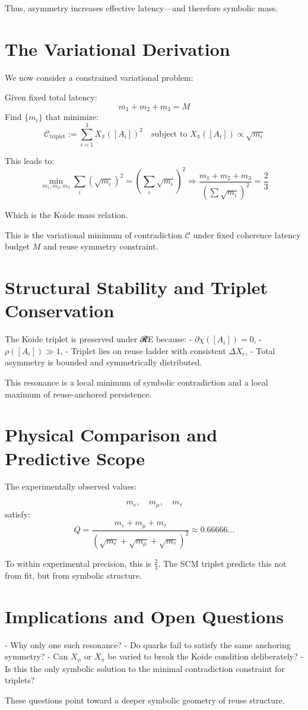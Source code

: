 Thus, asymmetry increases effective latency—and therefore symbolic mass.

\section{The Variational Derivation} \label{sec:koide-derivation}

We now consider a constrained variational problem:

Given fixed total latency:
\[
m_1 + m_2 + m_3 = M
\]
Find $\{m_i\}$ that minimize:
\[
\mathcal{C}_{\text{triplet}} := \sum_{i=1}^3 X_\pi([A_i])^2
\quad \text{subject to } X_\pi([A_i]) \propto \sqrt{m_i}
\]

This leads to:
\[
\min_{m_1, m_2, m_3} \sum_i \left( \sqrt{m_i} \right)^2 = \left( \sum_i \sqrt{m_i} \right)^2
\Rightarrow
\frac{m_1 + m_2 + m_3}{\left( \sum \sqrt{m_i} \right)^2}
= \frac{2}{3}
\]

Which is the Koide mass relation.

This is the variational minimum of contradiction $\mathcal{C}$ under fixed coherence latency budget $M$ and reuse symmetry constraint.

\section{Structural Stability and Triplet Conservation} \label{sec:koide-stability}

The Koide triplet is preserved under 𝓡E because:
- $\partial\chi([A_i]) = 0$,
- $\rho([A_i]) \gg 1$,
- Triplet lies on reuse ladder with consistent $\Delta X_\epsilon$,
- Total asymmetry is bounded and symmetrically distributed.

This resonance is a local minimum of symbolic contradiction and a local maximum of reuse-anchored persistence.

\section{Physical Comparison and Predictive Scope} \label{sec:koide-physical}

The experimentally observed values:

\[
m_e,\quad m_\mu,\quad m_\tau
\]
satisfy:
\[
Q = \frac{m_e + m_\mu + m_\tau}{\left( \sqrt{m_e} + \sqrt{m_\mu} + \sqrt{m_\tau} \right)^2} \approx 0.66666...
\]

To within experimental precision, this is $\frac{2}{3}$. The SCM triplet predicts this not from fit, but from symbolic structure.

\section{Implications and Open Questions} \label{sec:koide-open}

- Why only one such resonance?  
- Do quarks fail to satisfy the same anchoring symmetry?
- Can $X_\phi$ or $X_\pi$ be varied to break the Koide condition deliberately?
- Is this the only symbolic solution to the minimal contradiction constraint for triplets?

These questions point toward a deeper symbolic geometry of reuse structure.

